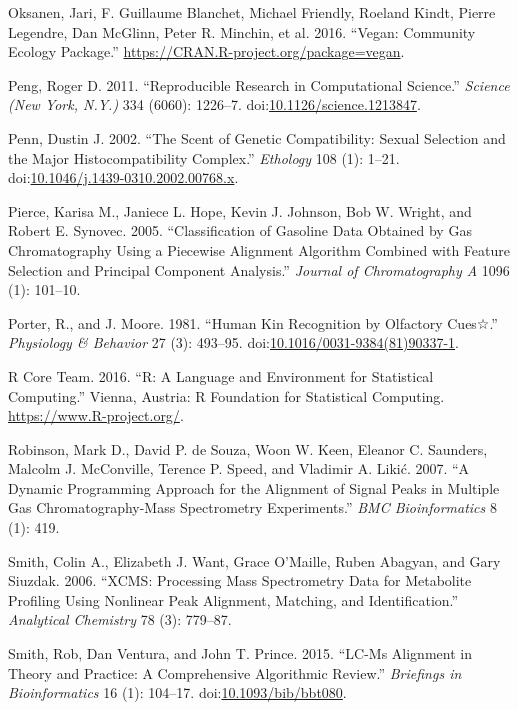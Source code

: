 \documentclass[]{article}
\begin{document}
\hypertarget{ref-Oksanen.2016}{}
Oksanen, Jari, F. Guillaume Blanchet, Michael Friendly, Roeland Kindt,
Pierre Legendre, Dan McGlinn, Peter R. Minchin, et al. 2016. ``Vegan:
Community Ecology Package.''
\url{https://CRAN.R-project.org/package=vegan}.

\hypertarget{ref-Peng.2011}{}
Peng, Roger D. 2011. ``Reproducible Research in Computational Science.''
\emph{Science (New York, N.Y.)} 334 (6060): 1226--7.
doi:\href{https://doi.org/10.1126/science.1213847}{10.1126/science.1213847}.

\hypertarget{ref-Penn.2002}{}
Penn, Dustin J. 2002. ``The Scent of Genetic Compatibility: Sexual
Selection and the Major Histocompatibility Complex.'' \emph{Ethology}
108 (1): 1--21.
doi:\href{https://doi.org/10.1046/j.1439-0310.2002.00768.x}{10.1046/j.1439-0310.2002.00768.x}.

\hypertarget{ref-Pierce.2005}{}
Pierce, Karisa M., Janiece L. Hope, Kevin J. Johnson, Bob W. Wright, and
Robert E. Synovec. 2005. ``Classification of Gasoline Data Obtained by
Gas Chromatography Using a Piecewise Alignment Algorithm Combined with
Feature Selection and Principal Component Analysis.'' \emph{Journal of
Chromatography A} 1096 (1): 101--10.

\hypertarget{ref-Porter.1981}{}
Porter, R., and J. Moore. 1981. ``Human Kin Recognition by Olfactory
Cues☆.'' \emph{Physiology \& Behavior} 27 (3): 493--95.
doi:\href{https://doi.org/10.1016/0031-9384(81)90337-1}{10.1016/0031-9384(81)90337-1}.

\hypertarget{ref-RCoreTeam.2016}{}
R Core Team. 2016. ``R: A Language and Environment for Statistical
Computing.'' Vienna, Austria: R Foundation for Statistical Computing.
\url{https://www.R-project.org/}.

\hypertarget{ref-Robinson.2007}{}
Robinson, Mark D., David P. de Souza, Woon W. Keen, Eleanor C. Saunders,
Malcolm J. McConville, Terence P. Speed, and Vladimir A. Likić. 2007.
``A Dynamic Programming Approach for the Alignment of Signal Peaks in
Multiple Gas Chromatography-Mass Spectrometry Experiments.'' \emph{BMC
Bioinformatics} 8 (1): 419.

\hypertarget{ref-Smith.2006}{}
Smith, Colin A., Elizabeth J. Want, Grace O'Maille, Ruben Abagyan, and
Gary Siuzdak. 2006. ``XCMS: Processing Mass Spectrometry Data for
Metabolite Profiling Using Nonlinear Peak Alignment, Matching, and
Identification.'' \emph{Analytical Chemistry} 78 (3): 779--87.

\hypertarget{ref-Smith.2015}{}
Smith, Rob, Dan Ventura, and John T. Prince. 2015. ``LC-Ms Alignment in
Theory and Practice: A Comprehensive Algorithmic Review.''
\emph{Briefings in Bioinformatics} 16 (1): 104--17.
doi:\href{https://doi.org/10.1093/bib/bbt080}{10.1093/bib/bbt080}.
\end{document}

